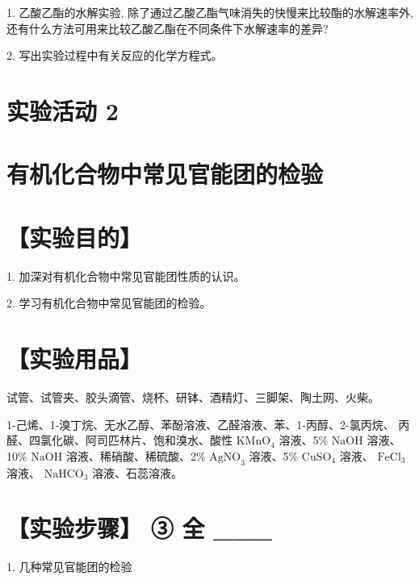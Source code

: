 \documentclass[10pt]{article}
\begin{document}
1. 乙酸乙酯的水解实验, 除了通过乙酸乙酯气味消失的快慢来比较酯的水解速率外, 还有什么方法可用来比较乙酸乙酯在不同条件下水解速率的差异?

2. 写出实验过程中有关反应的化学方程式。

\section*{实验活动 2}

\section*{有机化合物中常见官能团的检验}

\section*{【实验目的】}

1. 加深对有机化合物中常见官能团性质的认识。

2. 学习有机化合物中常见官能团的检验。

\section*{【实验用品】}

试管、试管夹、胶头滴管、烧杯、研钵、酒精灯、三脚架、陶土网、火柴。

1-己烯、1-溴丁烷、无水乙醇、苯酚溶液、乙醛溶液、苯、1-丙醇、2-氯丙烷、 丙醛、四氯化碳、阿司匹林片、饱和溴水、酸性 \({\mathrm{{KMnO}}}_{4}\) 溶液、5\% \(\mathrm{{NaOH}}\) 溶液、10\% \(\mathrm{{NaOH}}\) 溶液、稀硝酸、稀硫酸、2\% \({\mathrm{{AgNO}}}_{3}\) 溶液、5\% \({\mathrm{{CuSO}}}_{4}\) 溶液、 \({\mathrm{{FeCl}}}_{3}\) 溶液、 \({\mathrm{{NaHCO}}}_{3}\) 溶液、石蕊溶液。

\section*{【实验步骤】 ③ 全 \_\_\_}

1. 几种常见官能团的检验
\end{document}
